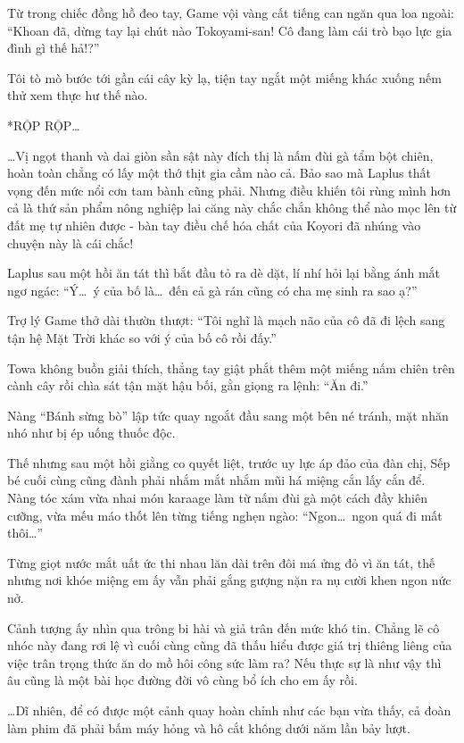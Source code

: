 \documentclass[../main.tex]{subfiles}
\begin{document}
Từ trong chiếc đồng hồ đeo tay, Game vội vàng cất tiếng can ngăn qua loa ngoài: ``Khoan đã, dừng tay lại chút nào Tokoyami-san! Cô đang làm cái trò bạo lực gia đình gì thế hả!?''

Tôi tò mò bước tới gần cái cây kỳ lạ, tiện tay ngắt một miếng khác xuống nếm thử xem thực hư thế nào.

*RỘP RỘP\dots*

\dots Vị ngọt thanh và dai giòn sần sật này đích thị là nấm đùi gà tẩm bột chiên, hoàn toàn chẳng có lấy một thớ thịt gia cầm nào cả. Bảo sao mà Laplus thất vọng đến mức nổi cơn tam bành cũng phải. Nhưng điều khiến tôi rùng mình hơn cả là thứ sản phẩm nông nghiệp lai căng này chắc chắn không thể nào mọc lên từ đất mẹ tự nhiên được - bàn tay điều chế hóa chất của Koyori đã nhúng vào chuyện này là cái chắc!

Laplus sau một hồi ăn tát thì bắt đầu tỏ ra dè dặt, lí nhí hỏi lại bằng ánh mắt ngơ ngác: ``Ý\dots\ ý của bố là\dots\ đến cả gà rán cũng có cha mẹ sinh ra sao ạ?''

Trợ lý Game thở dài thườn thượt: ``Tôi nghĩ là mạch não của cô đã đi lệch sang tận hệ Mặt Trời khác so với ý của bố cô rồi đấy.''

Towa không buồn giải thích, thẳng tay giật phắt thêm một miếng nấm chiên trên cành cây rồi chìa sát tận mặt hậu bối, gằn giọng ra lệnh: ``Ăn đi.''

Nàng ``Bánh sừng bò'' lập tức quay ngoắt đầu sang một bên né tránh, mặt nhăn nhó như bị ép uống thuốc độc.

Thế nhưng sau một hồi giằng co quyết liệt, trước uy lực áp đảo của đàn chị, Sếp bé cuối cùng cũng đành phải nhắm mắt nhắm mũi há miệng cắn lấy cắn để. Nàng tóc xám vừa nhai món karaage làm từ nấm đùi gà một cách đầy khiên cưỡng, vừa mếu máo thốt lên từng tiếng nghẹn ngào: ``Ngon\dots\ ngon quá đi mất thôi\dots''

Từng giọt nước mắt uất ức thi nhau lăn dài trên đôi má ửng đỏ vì ăn tát, thế nhưng nơi khóe miệng em ấy vẫn phải gắng gượng nặn ra nụ cười khen ngon nức nở.

Cảnh tượng ấy nhìn qua trông bi hài và giả trân đến mức khó tin. Chẳng lẽ cô nhóc này đang rơi lệ vì cuối cùng cũng đã thấu hiểu được giá trị thiêng liêng của việc trân trọng thức ăn do mồ hôi công sức làm ra? Nếu thực sự là như vậy thì âu cũng là một bài học đường đời vô cùng bổ ích cho em ấy rồi.

\dots Dĩ nhiên, để có được một cảnh quay hoàn chỉnh như các bạn vừa thấy, cả đoàn làm phim đã phải bấm máy hỏng và hô cắt không dưới năm lần bảy lượt.
\end{document}
